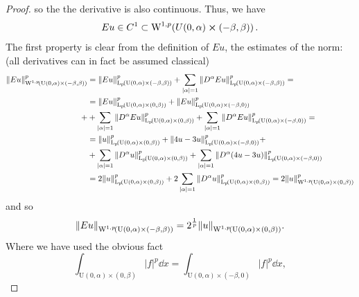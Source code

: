 \documentclass{article}
\begin{document}
\begin{proof}
	so the the derivative is also continuous. Thus, we have
	\[
		Eu  \in C^1 \subset \WkpSet[1][p]{U(0,\alpha) \cross (-\beta,\beta)}.
	\]
	The first property is clear from the definition of $Eu$, the estimates of the norm: (all derivatives can in fact be assumed classical)
	\begin{align*}
		\norm{Eu}_{\WkpSet[1][p]{\text{U}(0,\alpha) \times (-\beta,\beta)}}^p &= \norm{Eu}_{\LpSet{\text{U}(0,\alpha)\times (-\beta,\beta)}}^p + \sum_{|\alpha| = 1}\norm{D^{\alpha}Eu}_{\LpSet{\text{U}(0,\alpha)\times (-\beta, \beta)}}^p = \\
		&= \norm{Eu}_{\LpSet{\text{U}(0,\alpha) \times (0,\beta)}}^p +\norm{Eu}_{\LpSet{\text{U}(0,\alpha) \times (-\beta,0)}}^p \\ +
		& + \sum_{|\alpha| = 1}\norm{D^{\alpha}Eu}_{\LpSet{\text{U}(0,\alpha)\times (0, \beta)}}^p + \sum_{|\alpha| = 1}\norm{D^{\alpha}Eu}_{\LpSet{\text{U}(0,\alpha)\times (-\beta, 0)}}^p = \\
		& = \norm{u}_{\LpSet{\text{U}(0,\alpha)\times (0,\beta)}}^p + \norm{4u - 3u}_{\LpSet{\text{U}(0,\alpha)\times (-\beta, 0)}}^p + \\
		& + \sum_{|\alpha| = 1}\norm{D^{\alpha}u}_{\LpSet{\text{U}(0,\alpha)\times (0,\beta)}}^p + \sum_{|\alpha| =1}\norm{D^{\alpha}\qty(4u - 3u)}_{\LpSet{\text{U}(0,\alpha)\times (-\beta,0)}}^p \\
		&= 2 \norm{u}_{\LpSet{\text{U}(0,\alpha)\times (0,\beta)}}^p + 2 \sum_{|\alpha| =1}\norm{D^{\alpha}u}_{\LpSet{\text{U}(0,\alpha)\times (0,\beta)}}^p = 2 \norm{u}_{\WkpSet[1][p]{\text{U}(0,\alpha)\times (0,\beta)}}^p
	\end{align*}
	and so
	\[
		\norm{Eu}_{\WkpSet[1][p]{\text{U}(0,\alpha)\times (-\beta,\beta)}} = 2^{\frac{1}{p}} \norm{u}_{\WkpSet[1][p]{\text{U}(0,\alpha)\times (0,\beta)}}.
	\]
	Where we have used the obvious fact
	\[
		\int_{\text{U}(0,\alpha)\times (0,\beta)}|f|^p\dd{x} = \int_{\text{U}(0,\alpha)\times (-\beta,0)}|f|^p\dd{x},
	\]


\end{proof}
\end{document}
